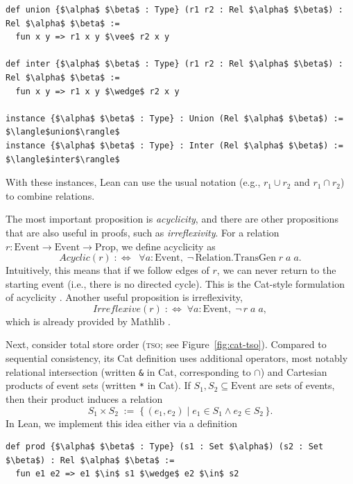 \begin{lstlisting}[mathescape=true]
def union {$\alpha$ $\beta$ : Type} (r1 r2 : Rel $\alpha$ $\beta$) : Rel $\alpha$ $\beta$ :=
  fun x y => r1 x y $\vee$ r2 x y

def inter {$\alpha$ $\beta$ : Type} (r1 r2 : Rel $\alpha$ $\beta$) : Rel $\alpha$ $\beta$ :=
  fun x y => r1 x y $\wedge$ r2 x y

instance {$\alpha$ $\beta$ : Type} : Union (Rel $\alpha$ $\beta$) := $\langle$union$\rangle$
instance {$\alpha$ $\beta$ : Type} : Inter (Rel $\alpha$ $\beta$) := $\langle$inter$\rangle$
\end{lstlisting}

With these instances, Lean can use the usual notation (e.g., $r_1 \cup r_2$ and $r_1 \cap r_2$) to combine relations.

The most important proposition is \emph{acyclicity}, and there are other propositions that are also useful in proofs, such as \emph{irreflexivity}. For a relation $r : \mathrm{Event} \to \mathrm{Event} \to \mathrm{Prop}$, we define acyclicity as
\[
  \mathit{Acyclic}(r)
  \;:\!\!\iff\;\;
  \forall a : \mathrm{Event},\; \neg\,\mathrm{Relation.TransGen}\; r\; a\; a.
\]
Intuitively, this means that if we follow edges of $r$, we can never return to the starting event (i.e., there is no directed cycle). This is the Cat-style formulation of acyclicity \citep{catManualSyntax11,catOnlineDocHerd}. Another useful proposition is irreflexivity,
\[
  \mathit{Irreflexive}(r) \;:\!\!\iff\; \forall a : \mathrm{Event},\; \neg\, r\; a\; a,
\]
which is already provided by Mathlib \citep{mathlib2020}.

Next, consider total store order (\textsc{tso}; see Figure~\ref{fig:cat-tso}). Compared to sequential consistency, its Cat definition uses additional operators, most notably relational intersection (written \texttt{\&} in Cat, corresponding to $\cap$) and Cartesian products of event sets (written \texttt{*} in Cat). If $S_1,S_2 \subseteq \mathrm{Event}$ are sets of events, then their product induces a relation
\[
  S_1 \times S_2
  \;:=\;
  \{\,(e_1,e_2) \mid e_1 \in S_1 \wedge e_2 \in S_2\,\}.
\]
In Lean, we implement this idea either via a definition

\begin{lstlisting}[language=Lean, mathescape=true]
def prod {$\alpha$ $\beta$ : Type} (s1 : Set $\alpha$) (s2 : Set $\beta$) : Rel $\alpha$ $\beta$ :=
  fun e1 e2 => e1 $\in$ s1 $\wedge$ e2 $\in$ s2
\end{lstlisting}

